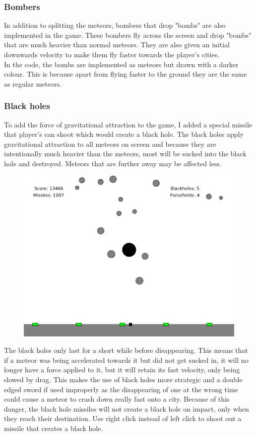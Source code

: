 \documentclass{article}
\newcommand{\n}[0]{\\[\baselineskip]}
\begin{document}
\subsubsection*{Bombers}
In addition to splitting the meteors, bombers that drop "bombs" are also implemented in the game. These bombers fly across the screen and drop "bombs" that are much heavier than normal meteors. They are also given an initial downwards velocity to make them fly faster towards the player's cities.
\n
In the code, the bombs are implemented as meteors but drawn with a darker colour. This is because apart from flying faster to the ground they are the same as regular meteors. 

\subsubsection*{Black holes}
To add the force of gravitational attraction to the game, I added a special missile that player's can shoot which would create a black hole. The black holes apply gravitational attraction to all meteors on screen and because they are intentionally much heavier than the meteors, most will be sucked into the black hole and destroyed. Meteors that are further away may be affected less.
\begin{figure}[H]
\centering
\includegraphics[width=1\textwidth]{imgs/Blackhole.png}
\end{figure}
\noindent
The black holes only last for a short while before disappearing. This means that if a meteor was being accelerated towards it but did not get sucked in, it will no longer have a force applied to it, but it will retain its fast velocity, only being slowed by drag. This makes the use of black holes more strategic and a double edged sword if used improperly as the disappearing of one at the wrong time could cause a meteor to crash down really fast onto a city. Because of this danger, the black hole missiles will not create a black hole on impact, only when they reach their destination. Use right click instead of left click to shoot out a missile that creates a black hole.
 
\end{document}
